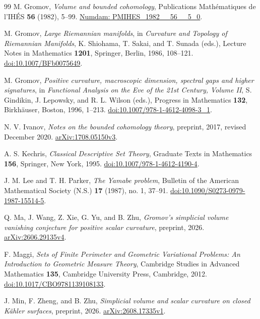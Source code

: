 \begin{thebibliography}{99}
M. Gromov, \emph{Volume and bounded cohomology},
Publications Math\'ematiques de l'IH\'ES \textbf{56} (1982), 5--99.
\href{https://www.numdam.org/item/PMIHES_1982__56__5_0/}
{Numdam: PMIHES\_1982\_\_56\_\_5\_0}.

M. Gromov, \emph{Large Riemannian manifolds}, in
\emph{Curvature and Topology of Riemannian Manifolds},
K. Shiohama, T. Sakai, and T. Sunada (eds.),
Lecture Notes in Mathematics \textbf{1201}, Springer, Berlin, 1986,
108--121.
\href{https://doi.org/10.1007/BFb0075649}{doi:10.1007/BFb0075649}.

M. Gromov, \emph{Positive curvature, macroscopic dimension, spectral
gaps and higher signatures}, in
\emph{Functional Analysis on the Eve of the 21st Century, Volume II},
S. Gindikin, J. Lepowsky, and R. L. Wilson (eds.),
Progress in Mathematics \textbf{132}, Birkh\"auser, Boston, 1996,
1--213.
\href{https://doi.org/10.1007/978-1-4612-4098-3_1}
{doi:10.1007/978-1-4612-4098-3\_1}.

N. V. Ivanov, \emph{Notes on the bounded cohomology theory},
preprint, 2017, revised December 2020.
\href{https://arxiv.org/abs/1708.05150v3}{arXiv:1708.05150v3}.

A. S. Kechris, \emph{Classical Descriptive Set Theory},
Graduate Texts in Mathematics \textbf{156}, Springer, New York, 1995.
\href{https://doi.org/10.1007/978-1-4612-4190-4}
{doi:10.1007/978-1-4612-4190-4}.

J. M. Lee and T. H. Parker, \emph{The Yamabe problem},
Bulletin of the American Mathematical Society (N.S.) \textbf{17}
(1987), no. 1, 37--91.
\href{https://doi.org/10.1090/S0273-0979-1987-15514-5}
{doi:10.1090/S0273-0979-1987-15514-5}.

Q. Ma, J. Wang, Z. Xie, G. Yu, and B. Zhu,
\emph{Gromov's simplicial volume vanishing conjecture for positive
scalar curvature}, preprint, 2026.
\href{https://arxiv.org/abs/2606.29135v4}{arXiv:2606.29135v4}.

F. Maggi, \emph{Sets of Finite Perimeter and Geometric Variational
Problems: An Introduction to Geometric Measure Theory},
Cambridge Studies in Advanced Mathematics \textbf{135},
Cambridge University Press, Cambridge, 2012.
\href{https://doi.org/10.1017/CBO9781139108133}
{doi:10.1017/CBO9781139108133}.

J. Min, F. Zheng, and B. Zhu,
\emph{Simplicial volume and scalar curvature on closed K\"ahler surfaces},
preprint, 2026.
\href{https://arxiv.org/abs/2608.17335v1}{arXiv:2608.17335v1}.


\end{thebibliography}
